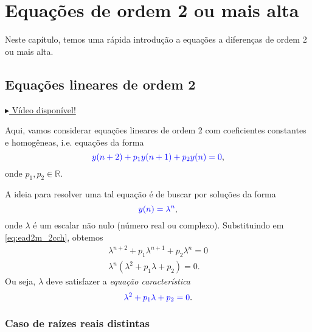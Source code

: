
\chapter{Equações de ordem 2 ou mais alta}\label{cap_ead2m}

Neste capítulo, temos uma rápida introdução a equações a diferenças de ordem 2 ou mais alta.

\section{Equações lineares de ordem 2}\label{cap_ead2m_sec_ead2lin}

\begin{flushright}
  \href{https://archive.org/details/ead-o2h}{$\blacktriangleright$ Vídeo disponível!}
\end{flushright}

Aqui, vamos considerar equações lineares de ordem 2 com coeficientes constantes e homogêneas, i.e. equações da forma
\begin{equation}\label{eq:ead2m_2cch}
  {\color{blue}y(n+2)+p_1y(n+1)+p_2y(n)=0},
\end{equation}
onde $p_1,p_2\in\mathbb{R}$.

A ideia para resolver uma tal equação é de buscar por soluções da forma
\begin{equation}
  {\color{blue}y(n)=\lambda^n},
\end{equation}
onde $\lambda$ é um escalar não nulo (número real ou complexo). Substituindo em \eqref{eq:ead2m_2cch}, obtemos
\begin{align}
  \lambda^{n+2}+p_1\lambda^{n+1} + p_2\lambda^n = 0\\
  \lambda^n\left(\lambda^{2}+p_1\lambda + p_2\right) = 0.
\end{align}
Ou seja, $\lambda$ deve satisfazer a \emph{equação característica}
\begin{equation}\label{eq:ead2m_2ec}
  {\color{blue}\lambda^{2}+p_1\lambda + p_2 = 0}.
\end{equation}

\subsection{Caso de raízes reais distintas}

